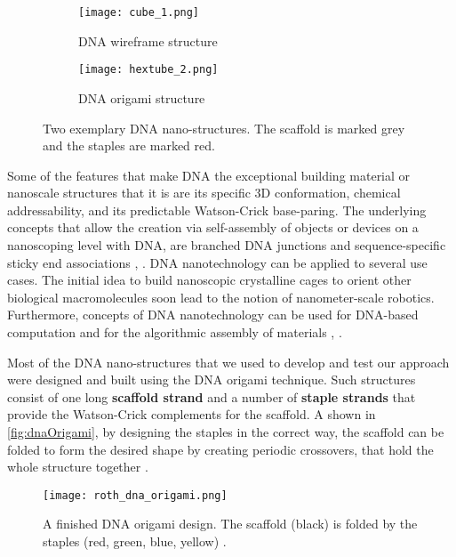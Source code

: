 \documentclass[draft,final]{vutinfth} %
\begin{document}
\begin{figure}
\centering
\begin{subfigure}{0.5\textwidth}
  \centering
  \texttt{[image: cube\_1.png]}
  \caption{DNA wireframe structure}
  \label{fig:cubeRotated_1}
\end{subfigure}%
\begin{subfigure}{0.5\textwidth}
  \centering
  \texttt{[image: hextube\_2.png]}
  \caption{DNA origami structure}
  \label{fig:tubeRotated_1}
\end{subfigure}
\caption{Two exemplary DNA nano-structures. The scaffold is marked grey and the staples are marked red.}
\label{fig:cubeAndTubeRotated_1}
\end{figure}

\par Some of the features that make DNA the exceptional building material or nanoscale structures that it is are its specific 3D conformation, chemical addressability, and its predictable Watson-Crick base-paring. The underlying concepts that allow the creation via self-assembly of objects or devices on a nanoscoping level with DNA, are branched DNA junctions and sequence-specific sticky end associations \cite{zhang2014structural}, \cite{seeman2007overview}. DNA nanotechnology can be applied to several use cases. The initial idea to build nanoscopic crystalline cages to orient other biological macromolecules soon lead to the notion of nanometer-scale robotics. Furthermore, concepts of DNA nanotechnology can be used for DNA-based computation and for the algorithmic assembly of materials \cite{seeman2007overview}, \cite{winfree1996computational}.

\par Most of the DNA nano-structures that we used to develop and test our approach were designed and built using the DNA origami technique. Such structures consist of one long \textbf{scaffold strand} and a number of \textbf{staple strands} that provide the Watson-Crick complements for the scaffold. A shown in \autoref{fig:dnaOrigami}, by designing the staples in the correct way, the scaffold can be folded to form the desired shape by creating periodic crossovers, that hold the whole structure together \cite{rothemund2006folding}.

\begin{figure}
\centering
\texttt{[image: roth\_dna\_origami.png]}
\caption{A finished DNA origami design. The scaffold (black) is folded by the staples (red, green, blue, yellow) \cite{rothemund2006folding}.}
\label{fig:dnaOrigami}
\end{figure}
\end{document}
